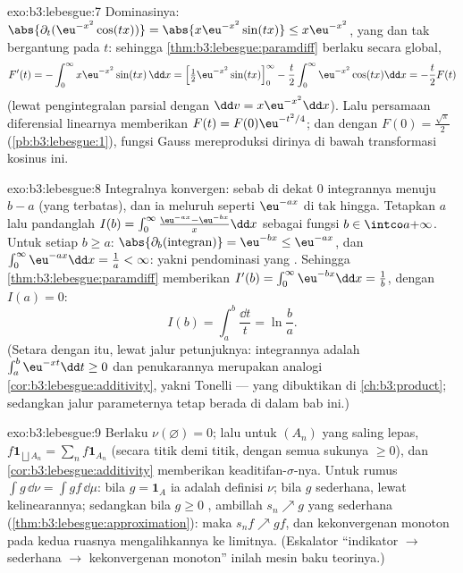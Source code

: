 \begin{solution}{exo:b3:lebesgue:7}
Dominasinya: $\abs{\partial_t(\eu^{-x^2}\cos(tx))} =
\abs{x\eu^{-x^2}\sin(tx)} \leq x\eu^{-x^2}$, yang  dan
tak bergantung pada $t$: sehingga \cref{thm:b3:lebesgue:paramdiff} berlaku
secara global,
\[
F'(t) = -\int_0^\infty x\eu^{-x^2}\sin(tx)\,\dd x
= \Bigl[\tfrac12\eu^{-x^2}\sin(tx)\Bigr]_0^\infty
- \frac t2\int_0^\infty\eu^{-x^2}\cos(tx)\dd x
= -\frac t2F(t)
\]
(lewat pengintegralan parsial dengan $\dd v = x\eu^{-x^2}\dd x$). Lalu
persamaan diferensial linearnya memberikan $F(t) = F(0)\eu^{-t^2/4}$; dan dengan $F(0) =
\frac{\sqrt\pi}2$ (\cref{pb:b3:lebesgue:1}), fungsi Gauss
mereproduksi dirinya di bawah transformasi kosinus ini.
\end{solution}

\begin{solution}{exo:b3:lebesgue:8}
Integralnya konvergen: sebab di dekat $0$ integrannya menuju $b - a$
(yang terbatas), dan ia meluruh seperti $\eu^{-ax}$ di tak hingga. Tetapkan $a$
lalu pandanglah $I(b) = \int_0^\infty\frac{\eu^{-ax} -
\eu^{-bx}}x\dd x$ sebagai fungsi $b \in \intco a{+\infty}$.
Untuk setiap $b \geq a$: $\abs{\partial_b(\text{integran})} =
\eu^{-bx} \leq \eu^{-ax}$, dan $\int_0^\infty\eu^{-ax}\dd x =
\frac1a < \infty$: yakni pendominasi yang . Sehingga
\cref{thm:b3:lebesgue:paramdiff} memberikan $I'(b) =
\int_0^\infty\eu^{-bx}\dd x = \frac1b$, dengan $I(a) = 0$:
\[
I(b) = \int_a^b\frac{\dd t}t = \ln\frac ba .
\]
(Setara dengan itu, lewat jalur petunjuknya: integrannya adalah
$\int_a^b\eu^{-xt}\dd t \geq 0$ dan penukarannya merupakan
analogi  \cref{cor:b3:lebesgue:additivity},
yakni Tonelli --- yang dibuktikan di \cref{ch:b3:product}; sedangkan
jalur parameternya tetap berada di dalam bab ini.)
\end{solution}

\begin{solution}{exo:b3:lebesgue:9}
Berlaku $\nu(\varnothing) = 0$; lalu untuk $(A_n)$ yang saling lepas, $f\mathbf
1_{\bigsqcup A_n} = \sum_nf\mathbf 1_{A_n}$ (secara titik demi titik, dengan semua
sukunya $\geq 0$), dan \cref{cor:b3:lebesgue:additivity} memberikan
keaditifan-$\sigma$-nya. Untuk rumus $\int g\,\dd\nu = \int
gf\,\dd\mu$: bila $g = \mathbf 1_A$ ia adalah definisi
$\nu$; bila $g$ sederhana, lewat kelinearannya; sedangkan bila $g \geq 0$ ,
ambillah $s_n \nearrow g$ yang sederhana
(\cref{thm:b3:lebesgue:approximation}): maka $s_nf \nearrow gf$, dan
kekonvergenan monoton pada kedua ruasnya mengalihkannya ke limitnya. (Eskalator ``indikator
$\to$ sederhana $\to$ kekonvergenan monoton'' inilah mesin baku
teorinya.)
\end{solution}

